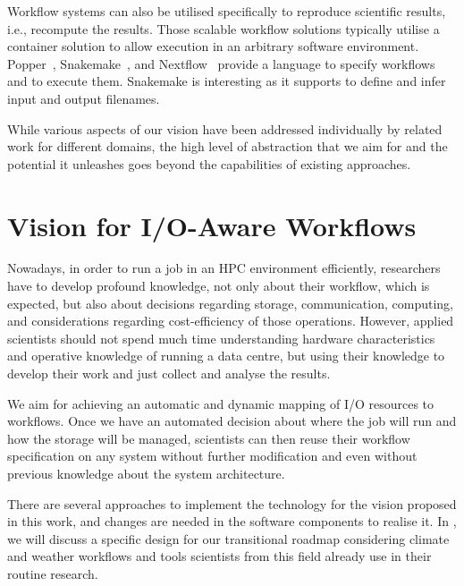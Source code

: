 \documentclass{superfri}
\begin{document}

Workflow systems can also be utilised specifically to reproduce scientific results, i.e., recompute the results.
Those scalable workflow solutions typically utilise a container solution to allow execution in an arbitrary software environment.
Popper~\cite{jimenez2017popper}, Snakemake~\cite{bts480}, and Nextflow~\cite{Nextflow} provide a language to specify workflows and to execute them.
Snakemake is interesting as it supports to define and infer input and output filenames.

While various aspects of our vision have been addressed individually by related work for different domains, the high level of abstraction that we aim for and the potential it unleashes goes beyond the capabilities of existing approaches.

\section{Vision for I/O-Aware Workflows}
\label{sec:vision}

Nowadays, in order to run a job in an HPC environment efficiently, researchers have to develop profound knowledge, not only about their workflow, which is expected, but also about decisions regarding storage, communication, computing, and considerations regarding cost-efficiency of those operations.
However, applied scientists should not spend much time understanding hardware characteristics and operative knowledge of running a data centre, but using their knowledge to develop their work and just collect and analyse the results.

We aim for achieving an automatic and dynamic mapping of I/O resources to workflows.
Once we have an automated decision about where the job will run and how the storage will be managed, scientists can then reuse their workflow specification on any system without further modification and even without previous knowledge about the system architecture.

There are several approaches to implement the technology for the vision proposed in this work, and changes are needed in the software components to realise it.
In , we will discuss a specific design for our transitional roadmap considering climate and weather workflows and tools scientists from this field already use in their routine research.
\end{document}
